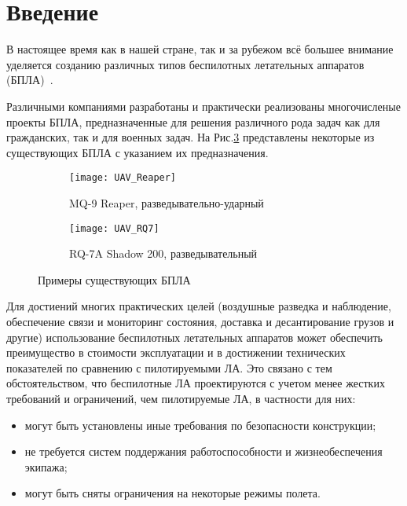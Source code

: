 \chapter*{Введение}

В настоящее время как в нашей стране, так и за рубежом всё большее внимание уделяется созданию различных типов беспилотных летательных аппаратов (БПЛА)~\cite{UAVBook}. 


Различными компаниями разработаны и практически реализованы многочисленые проекты БПЛА, предназначенные для решения различного рода задач как для гражданских, так и для военных задач. На Рис.\ref{fig:UAVs} представлены некоторые из существующих БПЛА с указанием их предназначения.


\begin{figure}[H]
        \begin{subfigure}[b]{0.47\textwidth}
                \texttt{[image: UAV\_Reaper]}
                \caption{MQ-9 Reaper, разведывательно-ударный} %
                \label{fig:UAV_Reaper}
        \end{subfigure}%
        \hspace{\fill}
        \begin{subfigure}[b]{0.47\textwidth}
                \texttt{[image: UAV\_RQ7]}
                \caption{RQ-7A Shadow 200, разведывательный}
                \label{fig:UAV_RQ7}
        \end{subfigure}
        \caption{Примеры существующих БПЛА}\label{fig:UAVs}
\end{figure}

Для достиений многих практических целей (воздушные разведка и наблюдение, обеспечение связи и мониторинг состояния, доставка и десантирование грузов и другие) использование беспилотных летательных аппаратов может обеспечить преимущество в стоимости эксплуатации и в достижении технических показателей по сравнению с пилотируемыми ЛА. Это связано с тем обстоятельством, что беспилотные ЛА проектируются с учетом менее жестких требований и ограничений, чем пилотируемые ЛА, в частности для них:

\begin{itemize}
\item могут быть установлены иные требования по безопасности конструкции;
\item не требуется систем поддержания работоспособности и жизнеобеспечения экипажа;
\item могут быть сняты ограничения на некоторые режимы полета.
\end{itemize} 

